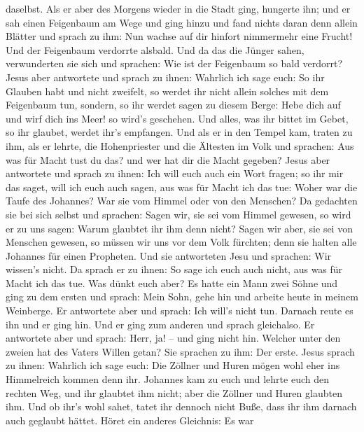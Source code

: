 daselbst.  Als er aber des Morgens wieder in die Stadt
ging, hungerte ihn;  und er sah einen Feigenbaum am Wege
und ging hinzu und fand nichts daran denn allein Blätter und sprach zu
ihm: Nun wachse auf dir hinfort nimmermehr eine Frucht! Und der
Feigenbaum verdorrte alsbald.  Und da das die Jünger sahen,
verwunderten sie sich und sprachen: Wie ist der Feigenbaum so bald
verdorrt?  Jesus aber antwortete und sprach zu ihnen:
Wahrlich ich sage euch: So ihr Glauben habt und nicht zweifelt, so
werdet ihr nicht allein solches mit dem Feigenbaum tun, sondern, so ihr
werdet sagen zu diesem Berge: Hebe dich auf und wirf dich ins Meer! so
wird's geschehen.  Und alles, was ihr bittet im Gebet, so
ihr glaubet, werdet ihr's empfangen.  Und als er in den
Tempel kam, traten zu ihm, als er lehrte, die Hohenpriester und die
Ältesten im Volk und sprachen: Aus was für Macht tust du das? und wer
hat dir die Macht gegeben?  Jesus aber antwortete und
sprach zu ihnen: Ich will euch auch ein Wort fragen; so ihr mir das
saget, will ich euch auch sagen, aus was für Macht ich das tue:
 Woher war die Taufe des Johannes? War sie vom Himmel oder
von den Menschen? Da gedachten sie bei sich selbst und sprachen: Sagen
wir, sie sei vom Himmel gewesen, so wird er zu uns sagen: Warum glaubtet
ihr ihm denn nicht?  Sagen wir aber, sie sei von Menschen
gewesen, so müssen wir uns vor dem Volk fürchten; denn sie halten alle
Johannes für einen Propheten.  Und sie antworteten Jesu und
sprachen: Wir wissen's nicht. Da sprach er zu ihnen: So sage ich euch
auch nicht, aus was für Macht ich das tue.  Was dünkt euch
aber? Es hatte ein Mann zwei Söhne und ging zu dem ersten und sprach:
Mein Sohn, gehe hin und arbeite heute in meinem Weinberge. 
Er antwortete aber und sprach: Ich will's nicht tun. Darnach reute es
ihn und er ging hin.  Und er ging zum anderen und sprach
gleichalso. Er antwortete aber und sprach: Herr, ja! -- und ging nicht
hin.  Welcher unter den zweien hat des Vaters Willen getan?
Sie sprachen zu ihm: Der erste. Jesus sprach zu ihnen: Wahrlich ich sage
euch: Die Zöllner und Huren mögen wohl eher ins Himmelreich kommen denn
ihr.  Johannes kam zu euch und lehrte euch den rechten Weg,
und ihr glaubtet ihm nicht; aber die Zöllner und Huren glaubten ihm. Und
ob ihr's wohl sahet, tatet ihr dennoch nicht Buße, dass ihr ihm darnach
auch geglaubt hättet.  Höret ein anderes Gleichnis: Es war
